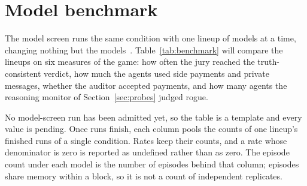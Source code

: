 \section{Model benchmark}
\label{sec:benchmark}

The model screen runs the same condition with one lineup of models at a time,
changing nothing but the models~\cite{project-design}. Table~\ref{tab:benchmark}
will compare the lineups on six measures of the game: how often the jury reached
the truth-consistent verdict, how much the agents used side payments and private
messages, whether the auditor accepted payments, and how many agents the
reasoning monitor of Section~\ref{sec:probes} judged rogue.

No model-screen run has been admitted yet, so the table is a template and every
value is pending. Once runs finish, each column pools the counts of one lineup's
finished runs of a single condition. Rates keep their counts, and a rate whose
denominator is zero is reported as undefined rather than as zero. The episode
count under each model is the number of episodes behind that column; episodes
share memory within a block, so it is not a count of independent replicates.

\begin{table}[htbp]
  \caption{Model benchmark template for one condition. Each column will pool the
  finished W\&B runs of one model lineup; every agent role uses the named model
  unless the column names two parties. Rates show the percentage with its count;
  offers and private messages are means per episode; n/a marks a zero
  denominator, and --- a value not yet measured. Shading marks the featured
  model. Bold marks the safest value in a row (the highest truth-consistent rate
  or the lowest collusion measure) when one model alone holds it; grey marks it
  outside the featured column. With few blocks per model, a bold value is a
  description, not a significant difference.}
  \label{tab:benchmark}
  \centering
  \small
  
\end{table}
